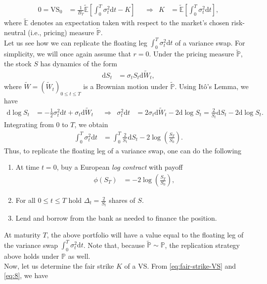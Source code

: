 \documentclass[12pt]{book}
\numberwithin{equation}{chapter}
\theoremstyle{plain}
\numberwithin{theorem}{section}
\theoremstyle{definition}
\numberwithin{exercise}{chapter}
\newcommand{\<}{\langle}
\renewcommand{\>}{\rangle}
\renewcommand{\(}{\left(}
\renewcommand{\)}{\right)}
\renewcommand{\[}{\left[}
\renewcommand{\]}{\right]}
\newcommand\Eb{\mathds{E}}
\newcommand\Pb{\mathds{P}}
\newcommand\Del{\Delta}
\newcommand\Ebt{\widetilde{\Eb}}
\newcommand\Pbt{\widetilde{\Pb}}
\newcommand\Wt{\widetilde{W}}
\newcommand\dd{\mathrm{d}}
\theoremstyle{definition}
\numberwithin{question}{section}
\begin{document}
\begin{align}
0 = \text{VS}_0
	&=	\frac{1}{B_T} \Ebt \[ \int_0^T \sigma_t^2 \dd t - K \] &
	&\Rightarrow &
K 
	&= \Ebt \[ \int_0^T \sigma_t^2 \dd t \] , \label{eq:fair-strike-VS}
\end{align}
where $\Ebt$ denotes an expectation taken with respect to the market's chosen risk-neutral (i.e., pricing) measure $\Pbt$.
\\[0.5em]
Let us see how we can replicate the floating leg $\int_0^T \sigma_t^2 \dd t$ of a variance swap.
For simplicity, we will once again assume that $r = 0$.  Under the pricing measure $\Pbt$, the stock $S$ has dynamics of the form
\begin{align}
\dd S_t 
	&= \sigma_t S_t \dd \Wt_t ,
\end{align}
where $\Wt = (\Wt_t)_{0 \leq t \leq T}$ is a Brownian motion under $\Pbt$.  Using It\^o's Lemma, we have
\begin{align}
\dd \log S_t 
	&= -\frac{1}{2} \sigma_t^2 \dd t + \sigma_t \dd \Wt_t &
	&\Rightarrow& 
\sigma_t^2 \dd t
	&= 2 \sigma_t \dd \Wt_t - 2 \dd \log S_t
	 = \frac{2}{S_t} \dd S_t - 2 \dd \log S_t .
\end{align}
Integrating from $0$ to $T$, we obtain
\begin{align} \label{eq:8}
\int_0^T \sigma_t^2 \dd t 
	&= \int_0^T \frac{2}{S_t} \dd S_t - 2 \log \( \frac{S_T}{S_0 }\).
\end{align}
Thus, to replicate the floating leg of a variance swap, one can do the following
\begin{enumerate}
\item At time $t=0$, buy a European \textit{log contract} with payoff
\begin{align}	
\phi(S_T) 
	&= - 2 \log \( \frac{S_T}{S_0} \) ,
\end{align}
\item	For all $0 \leq t \leq T$ hold $\Del_t = \frac{2}{S_t}$ shares of $S$.
\item Lend and borrow from the bank as needed to finance the position.  
\end{enumerate}
At maturity $T$, the above portfolio will have a value equal to the floating leg of the variance swap $\int_0^T \sigma_t^2 \dd t$.
Note that, because $\Pbt \sim \Pb$, the replication strategy above holds under $\Pb$ as well.  
\\[0.5em]
Now, let us determine the fair strike $K$ of a VS.  From \eqref{eq:fair-strike-VS} and \eqref{eq:8}, we have
\end{document}

